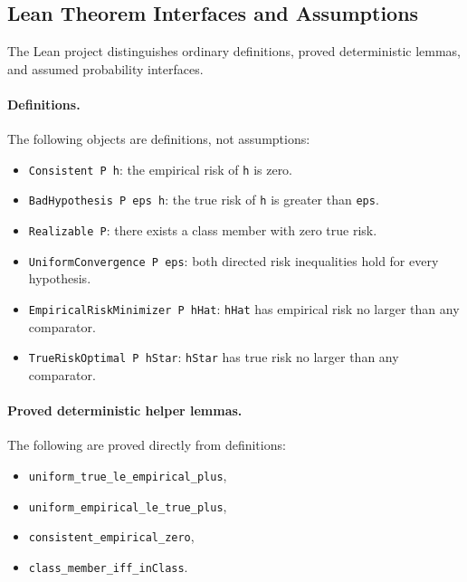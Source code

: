 \documentclass[11pt]{article}
\theoremstyle{definition}
\begin{document}
\subsection{Lean Theorem Interfaces and Assumptions}

The Lean project distinguishes ordinary definitions, proved deterministic
lemmas, and assumed probability interfaces.

\paragraph{Definitions.}
The following objects are definitions, not assumptions:
\begin{itemize}[leftmargin=*]
  \item \texttt{Consistent P h}: the empirical risk of \texttt{h} is zero.
  \item \texttt{BadHypothesis P eps h}: the true risk of \texttt{h} is greater
  than \texttt{eps}.
  \item \texttt{Realizable P}: there exists a class member with zero true risk.
  \item \texttt{UniformConvergence P eps}: both directed risk inequalities hold
  for every hypothesis.
  \item \texttt{EmpiricalRiskMinimizer P hHat}: \texttt{hHat} has empirical risk
  no larger than any comparator.
  \item \texttt{TrueRiskOptimal P hStar}: \texttt{hStar} has true risk no larger
  than any comparator.
\end{itemize}

\paragraph{Proved deterministic helper lemmas.}
The following are proved directly from definitions:
\begin{itemize}[leftmargin=*]
  \item \texttt{uniform\_true\_le\_empirical\_plus},
  \item \texttt{uniform\_empirical\_le\_true\_plus},
  \item \texttt{consistent\_empirical\_zero},
  \item \texttt{class\_member\_iff\_inClass}.
\end{itemize}
\end{document}
